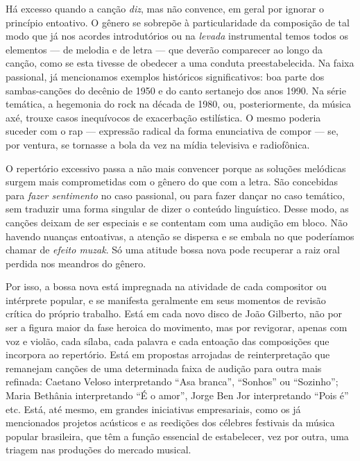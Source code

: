 Há excesso quando a canção \textit{diz}, mas não convence, em geral por
ignorar o princípio entoativo. O gênero se sobrepõe à particularidade da
composição de tal modo que já nos acordes introdutórios ou na \textit{levada}
instrumental temos todos os elementos --- de melodia e de letra --- que
deverão comparecer ao longo da canção, como se esta tivesse de obedecer
a uma conduta preestabelecida. Na faixa passional, já mencionamos
exemplos históricos significativos: boa parte dos sambas-canções do
decênio de 1950 e do canto sertanejo dos anos 1990. Na série temática, a
hegemonia do rock na década de 1980, ou, posteriormente, da música axé,
trouxe casos inequívocos de exacerbação estilística. O mesmo poderia
suceder com o rap --- expressão radical da forma enunciativa de compor
--- se, por ventura, se tornasse a bola da vez na mídia televisiva e
radiofônica.

O repertório excessivo passa a não mais convencer porque as soluções
melódicas surgem mais comprometidas com o gênero do que com a letra. São
concebidas para \textit{fazer sentimento} no caso passional, ou para fazer
dançar no caso temático, sem traduzir uma forma singular de dizer o
conteúdo linguístico. Desse modo, as canções deixam de ser especiais e
se contentam com uma audição em bloco. Não havendo nuanças entoativas, a
atenção se dispersa e se embala no que poderíamos chamar de \textit{efeito
muzak}. Só uma atitude bossa nova pode recuperar a raiz oral perdida nos
meandros do gênero.

Por isso, a bossa nova está impregnada na atividade de cada compositor
ou intérprete popular, e se manifesta geralmente em seus momentos de
revisão crítica do próprio trabalho. Está em cada novo disco de João
Gilberto, não por ser a figura maior da fase heroica do movimento, mas
por revigorar, apenas com voz e violão, cada sílaba, cada palavra e cada
entoação das composições que incorpora ao repertório. Está em propostas
arrojadas de reinterpretação que remanejam canções de uma determinada
faixa de audição para outra mais refinada: Caetano Veloso interpretando
``Asa branca'', ``Sonhos'' ou ``Sozinho''; Maria Bethânia interpretando
``É o amor'', Jorge Ben Jor interpretando ``Pois é'' etc. Está, até
mesmo, em grandes iniciativas empresariais, como os já mencionados
projetos acústicos e as reedições dos célebres festivais da música
popular brasileira, que têm a função essencial de estabelecer, vez por
outra, uma triagem nas produções do mercado musical.

